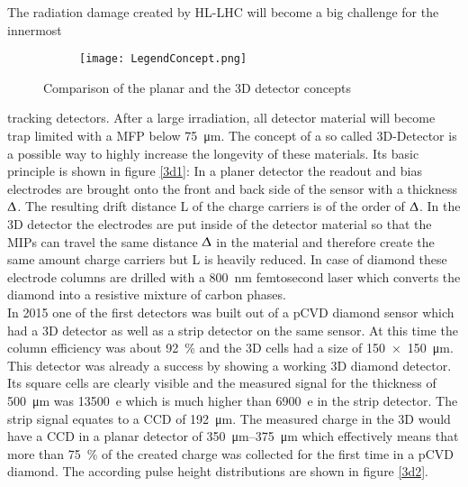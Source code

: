 The radiation damage created by \ac{HL-LHC} will become a big challenge for the innermost 
\begin{figure}[h]
	\centering
	\begin{subfigure}{0.1\textwidth}  
		\centering 
		\texttt{[image: LegendConcept.png]}
		\vspace*{19pt}
	\end{subfigure}
	\caption{Comparison of the planar and the 3D detector concepts}
	\label{3d1}
\end{figure}
\noindent tracking detectors. After a large irradiation, all detector material will become trap limited with a \ac{MFP} below \SI{75}{\micro\meter}. The concept of a so called 3D-Detector is a possible way to highly increase the longevity of these materials. Its basic principle is shown in figure \vref{3d1}: In a planer detector the readout and bias electrodes are brought onto the front and back side of the sensor with a thickness $\Updelta$. The resulting drift distance L of the charge carriers is of the order of $\Updelta$. In the 3D detector the electrodes are put inside of the detector material so that the \acp{MIP} can travel the same distance $\Updelta$ in the material and therefore create the same amount charge carriers but L is heavily reduced. In case of diamond these electrode columns are drilled with a \SI{800}{\nano\meter} femtosecond laser which converts the diamond into a resistive mixture of carbon phases.\\
In 2015 one of the first detectors was built out of a \ac{pCVD} diamond sensor which had a 3D detector 
as well as a strip detector on the same sensor. At this time the column efficiency was about \SI{92}{\%} and the 3D cells had a size of \SI{150x150}{\micro\meter}. This detector was already a success by showing a working 3D diamond detector. Its square cells are clearly visible and the measured signal for the thickness of \SI{500}{\micro\meter} was \SI{13500}{e} which is much higher than \SI{6900}{e} in the strip detector. The strip signal equates to a \ac{CCD} of \SI{192}{\micro\meter}. The measured charge in the 3D would have a \ac{CCD} in a planar detector of \SIrange{350}{375}{\micro\meter} which effectively means that more than \SI{75}{\%} of the created charge was collected for the 
first time in a \ac{pCVD} diamond. The according pulse height distributions are shown in figure \vref{3d2}.\\
